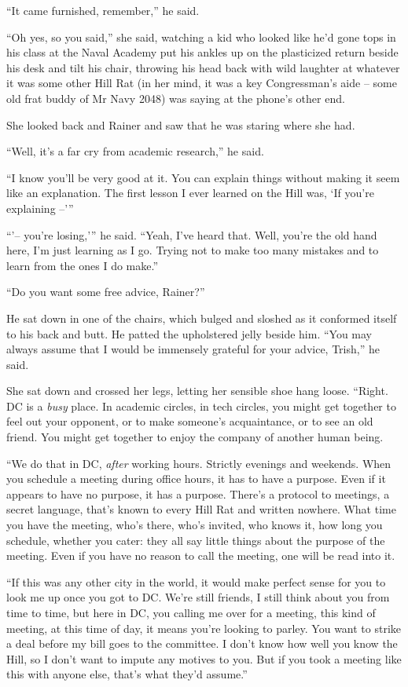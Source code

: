“It came furnished, remember,” he said.

“Oh yes, so you said,” she said, watching a kid who looked like 
he'd gone tops in his class at the Naval Academy put his ankles up on 
the plasticized return beside his desk and tilt his chair, throwing his 
head back with wild laughter at whatever it was some other Hill Rat (in 
her mind, it was a key Congressman's aide -- some old frat buddy of Mr 
Navy 2048) was saying at the phone's other end.

She looked back and Rainer and saw that he was staring where she had.

“Well, it's a far cry from academic research,” he said.

“I know you'll be very good at it. You can explain things without 
making it seem like an explanation. The first lesson I ever learned on 
the Hill was, `If you're explaining --'”

“'-- you're losing,'” he said. “Yeah, I've heard that. Well, 
you're the old hand here, I'm just learning as I go. Trying not to make 
too many mistakes and to learn from the ones I do make.”

“Do you want some free advice, Rainer?”

He sat down in one of the chairs, which bulged and sloshed as it 
conformed itself to his back and butt. He patted the upholstered jelly 
beside him. “You may always assume that I would be immensely grateful 
for your advice, Trish,” he said.

She sat down and crossed her legs, letting her sensible shoe hang 
loose. “Right. DC is a \emph{busy} place. In academic circles, in 
tech circles, you might get together to feel out your opponent, or to 
make someone's acquaintance, or to see an old friend. You might get 
together to enjoy the company of another human being.

“We do that in DC, \emph{after} working hours. Strictly evenings and 
weekends. When you schedule a meeting during office hours, it has to 
have a purpose. Even if it appears to have no purpose, it has a 
purpose. There's a protocol to meetings, a secret language, that's 
known to every Hill Rat and written nowhere. What time you have the 
meeting, who's there, who's invited, who knows it, how long you 
schedule, whether you cater: they all say little things about the 
purpose of the meeting. Even if you have no reason to call the meeting, 
one will be read into it.

“If this was any other city in the world, it would make perfect sense 
for you to look me up once you got to DC. We're still friends, I still 
think about you from time to time, but here in DC, you calling me over 
for a meeting, this kind of meeting, at this time of day, it means 
you're looking to parley. You want to strike a deal before my bill goes 
to the committee. I don't know how well you know the Hill, so I don't 
want to impute any motives to you. But if you took a meeting like this 
with anyone else, that's what they'd assume.”


